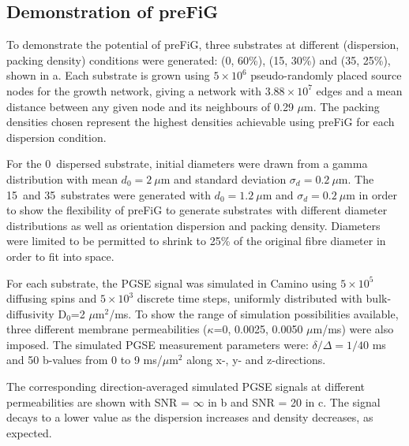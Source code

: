 \subsection{Demonstration of \acs{preFiG}}
\label{sec:ipmi_demonstration}
To demonstrate the potential of \ac{preFiG}, three substrates at different (dispersion, packing density) conditions were generated: (0\degree, 60\%), (15\degree, 30\%) and (35\degree, 25\%), shown in a.
Each substrate is grown using $5 \times 10^6$ pseudo-randomly placed source nodes for the growth network, giving a network with $3.88\times10^7$  edges and a mean distance between any given node and its neighbours of 0.29 $\mu$m.
The packing densities chosen represent the highest densities achievable using \ac{preFiG} for each dispersion condition.


For the 0\degree\ dispersed substrate, initial diameters were drawn from a gamma distribution with mean $d_0 = 2\ \mu$m and standard deviation $\sigma_d = 0.2\ \mu$m. The 15\degree\ and 35\degree\ substrates were generated with $d_0 = 1.2\ \mu$m and $\sigma_d = 0.2\ \mu$m in order to show the flexibility of \ac{preFiG} to generate substrates with different diameter distributions as well as orientation dispersion and packing density. Diameters were limited to be permitted to shrink to 25\% of the original fibre diameter in order to fit into space.

For each substrate, the \acf{PGSE} signal was simulated in Camino\cite{Cook2006} using $5\times 10^5$ diffusing spins and $5\times 10^3$ discrete time steps, uniformly distributed with bulk-diffusivity D$_0$=2 $\mu$m$^2$/ms. To show the range of simulation possibilities available, three different membrane permeabilities ($\kappa$=0, 0.0025, 0.0050 $\mu$m/ms) were also imposed.
The simulated \ac{PGSE} measurement parameters were: $\delta/\Delta=1/40$ ms and 50 b-values from 0 to 9 ms/$\mu$m$^2$ along x-, y- and z-directions.

The corresponding direction-averaged simulated \ac{PGSE} signals at different permeabilities are shown with SNR = $\infty$ in b and SNR = 20 in c.
The signal decays to a lower value as the dispersion increases and density decreases, as expected.

